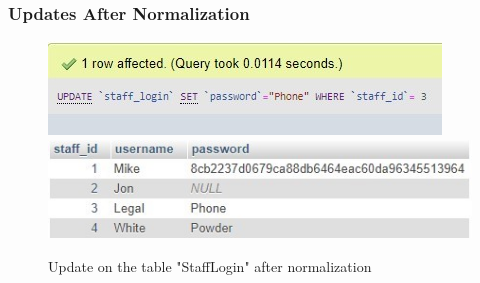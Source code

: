 \documentclass[openany]{article}
\begin{document}
	\subsubsection{Updates After Normalization}
		\begin{figure}[H]
			\includegraphics[width=\textwidth]{stafflogin1_update_norm}
			\includegraphics[width=\textwidth]{stafflogin2_update_norm}
			\caption{Update on the table "Staff\textunderscore Login" after normalization}
		\end{figure}
\end{document}
